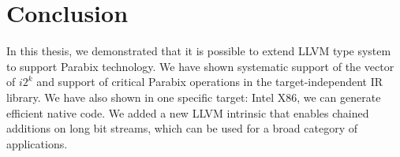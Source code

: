 %
%

\chapter{Conclusion}
\label{seven}

In this thesis, we demonstrated that it is possible to extend LLVM type system to support Parabix technology. We have shown systematic support of the vector of $i2^k$ and support of critical Parabix operations in the target-independent IR library. We have also shown in one specific target: Intel X86, we can generate efficient native code. We added a new LLVM intrinsic that enables chained additions on long bit streams, which can be used for a broad category of applications.
